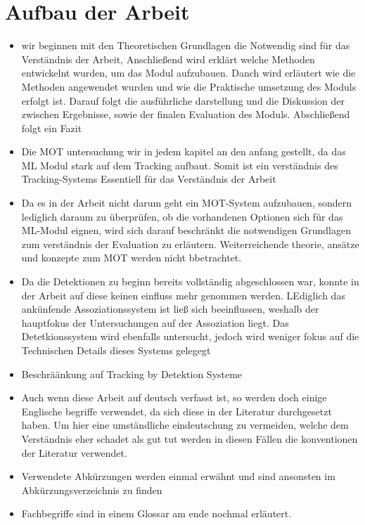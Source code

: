 \section{Aufbau der Arbeit}
\begin{itemize}
    \item wir beginnen mit den Theoretischen Grundlagen die Notwendig sind für das Verständnis der Arbeit, Anschließend wird erklärt welche Methoden entwickelnt wurden, um das Modul aufzubauen. Danch wird erläutert wie die Methoden angewendet wurden und wie die Praktische umsetzung des Moduls erfolgt ist. Darauf folgt die ausführliche darstellung und die Diskussion der zwischen Ergebnisse, sowie der finalen Evaluation des Moduls. Abschließend folgt ein Fazit 
    \item Die \acrshort{MOT} untersuchung wir in jedem kapitel an den anfang gestellt, da das \acrshort{ML} Modul stark auf dem Tracking aufbaut. Somit ist ein verständnis des Tracking-Systems Essentiell für das Verständnis der Arbeit
    \item Da es in der Arbeit nicht darum geht ein \acrshort{MOT}-System aufzubauen, sondern lediglich daraum zu überprüfen, ob die vorhandenen Optionen sich für das \acrshort{ML}-Modul eignen, wird sich darauf beschränkt die notwendigen Grundlagen zum verständnis der Evaluation zu erläutern. Weiterreichende theorie, ansätze und konzepte zum \acrshort{MOT} werden nicht bbetrachtet.
    \item Da die Detektionen zu beginn bereits vollständig abgeschlossen war, konnte in der Arbeit auf diese keinen einfluss mehr genommen werden. LEdiglich das ankünfende Assoziationssystem ist ließ sich beeinflussen, weshalb der hauptfokus der Untersuchungen auf der Assoziation liegt. Das Detetkionssystem wird ebenfalls untersucht, jedoch wird weniger fokus auf die Technischen Details dieses Systems gelegegt 
    \item Beschräänkung auf Tracking by Detektion Systeme
    \item Auch wenn diese Arbeit auf deutsch verfasst ist, so werden doch einige Englische begriffe verwendet, da sich diese in der Literatur durchgesetzt haben. Um hier eine umständliche eindeutschung zu vermeiden, welche dem Verständnis eher schadet als gut tut werden in diesen Fällen die konventionen der Literatur verwendet.
    \item Verwendete Abkürzungen werden einmal erwähnt und sind ansonsten im Abkürzungsverzeichnis zu finden 
    \item Fachbegriffe sind in einem Glossar am ende nochmal erläutert.
\end{itemize} 